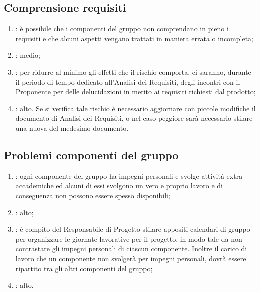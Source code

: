 \subsection{Comprensione requisiti}
\begin{enumerate}
\item {}: è possibile che i componenti del gruppo non comprendano in pieno i requisiti e che alcuni aspetti vengano trattati in maniera errata o incompleta;
\item {}: medio;
\item {}: per ridurre al minimo gli effetti che il rischio comporta, ci saranno, durante il periodo di tempo dedicato all'Analisi dei Requisiti, degli incontri con il Proponente per delle delucidazioni in merito ai requisiti richiesti dal prodotto;
\item {}: alto. Se si verifica tale rischio è necessario aggiornare con piccole modifiche il documento di Analisi dei Requisiti, o nel caso peggiore sarà necessario stilare una nuova  del medesimo documento.
\end{enumerate}

\subsection{Problemi componenti del gruppo}
\begin{enumerate}
\item {}: ogni componente del gruppo ha impegni personali e svolge attività extra accademiche ed alcuni di essi svolgono un vero e proprio lavoro e di conseguenza non possono essere spesso disponibili;
\item {}: alto;
\item {}: è compito del Responsabile di Progetto stilare appositi calendari di gruppo per organizzare le giornate lavorative per il progetto, in modo tale da non contrastare gli impegni personali di ciascun componente. Inoltre il carico di lavoro che un componente non svolgerà per impegni personali, dovrà essere ripartito tra gli altri componenti del gruppo;
\item {}: alto.
\end{enumerate}

